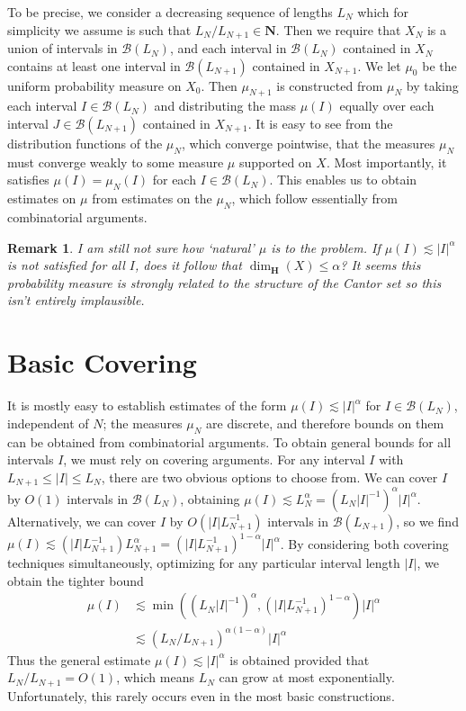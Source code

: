 \documentclass{report}
\theoremstyle{plain}
\theoremstyle{plain}
\newtheorem*{remark}{Remark}
\begin{document}
To be precise, we consider a decreasing sequence of lengths $L_N$ which for simplicity we assume is such that $L_N/L_{N+1} \in \mathbf{N}$. Then we require that $X_N$ is a union of intervals in $\mathcal{B}(L_N)$, and each interval in $\mathcal{B}(L_N)$ contained in $X_N$ contains at least one interval in $\mathcal{B}(L_{N+1})$ contained in $X_{N+1}$. We let $\mu_0$ be the uniform probability measure on $X_0$. Then $\mu_{N+1}$ is constructed from $\mu_N$ by taking each interval $I \in \mathcal{B}(L_N)$ and distributing the mass $\mu(I)$ equally over each interval $J \in \mathcal{B}(L_{N+1})$ contained in $X_{N+1}$. It is easy to see from the distribution functions of the $\mu_N$, which converge pointwise, that the measures $\mu_N$ must converge weakly to some measure $\mu$ supported on $X$. Most importantly, it satisfies $\mu(I) = \mu_N(I)$ for each $I \in \mathcal{B}(L_N)$. This enables us to obtain estimates on $\mu$ from estimates on the $\mu_N$, which follow essentially from combinatorial arguments.

\begin{remark}
    I am still not sure how `natural' $\mu$ is to the problem. If $\mu(I) \lesssim |I|^\alpha$ is {\it not} satisfied for all $I$, does it follow that $\dim_{\mathbf{H}}(X) \leq \alpha$? It seems this probability measure is strongly related to the structure of the Cantor set so this isn't entirely implausible.
\end{remark}

\section{Basic Covering}

It is mostly easy to establish estimates of the form $\mu(I) \lesssim |I|^\alpha$ for $I \in \mathcal{B}(L_N)$, independent of $N$; the measures $\mu_N$ are discrete, and therefore bounds on them can be obtained from combinatorial arguments. To obtain general bounds for all intervals $I$, we must rely on covering arguments. For any interval $I$ with $L_{N+1} \leq |I| \leq L_N$, there are two obvious options to choose from. We can cover $I$ by $O(1)$ intervals in $\mathcal{B}(L_N)$, obtaining $\mu(I) \lesssim L_N^\alpha = (L_N |I|^{-1})^\alpha |I|^\alpha$. Alternatively, we can cover $I$ by $O(|I| L_{N+1}^{-1})$ intervals in $\mathcal{B}(L_{N+1})$, so we find $\mu(I) \lesssim (|I| L_{N+1}^{-1}) L_{N+1}^\alpha = (|I| L_{N+1}^{-1})^{1-\alpha} |I|^\alpha$. By considering both covering techniques simultaneously, optimizing for any particular interval length $|I|$, we obtain the tighter bound
%
\begin{align*}
    \mu(I) &\lesssim \min\left( (L_N |I|^{-1})^\alpha, (|I| L_{N+1}^{-1})^{1 - \alpha} \right) |I|^\alpha\\
        &\lesssim (L_N / L_{N+1})^{\alpha(1 - \alpha)} |I|^\alpha
\end{align*}
%
Thus the general estimate $\mu(I) \lesssim |I|^\alpha$ is obtained provided that $L_N/L_{N+1} = O(1)$, which means $L_N$ can grow at most exponentially. Unfortunately, this rarely occurs even in the most basic constructions.
\end{document}

